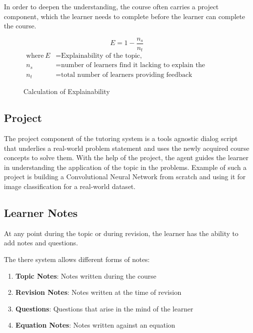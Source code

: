 \documentclass[]{article}
\begin{document}
In order to deepen the understanding, the course often carries a project component, which the learner needs to complete before the learner can complete the course. 
\begin{figure}
  \begin{equation}
    E = 1 -  \frac{n_s}{n_t}  
  \end{equation}
\begin{align*}
  \text{where}~E &= \text{Explainability of the topic,} \\
  n_s &= \text{number of learners find it lacking to explain the intended topic}\\
  n_t &= \text{total number of learners providing feedback}
\end{align*}
\caption{Calculation of Explainability}
\label{eq:1}
\end{figure}
\subsection[Project]{Project}


The project component of the tutoring system is a tools agnostic dialog script that underlies a real-world problem statement and uses the newly acquired course concepts to solve them. With the help of the project, the agent guides the learner in understanding the application of the topic in the problems. Example of such a project is building a Convolutional Neural Network from scratch and using it for image classification for a real-world dataset.


\subsection[Learner Notes]{Learner Notes}

At any point during the topic or during revision, the learner has the ability to add notes and questions. 

The there system allows different forms of notes:
\begin{enumerate}
  \item \textbf{Topic Notes}: Notes written during the course
  \item \textbf{Revision Notes}: Notes written at the time of revision
  \item \textbf{Questions}: Questions that arise in the mind of the learner
  \item \textbf{Equation Notes}: Notes written against an equation
\end{enumerate}
  
\end{document}
